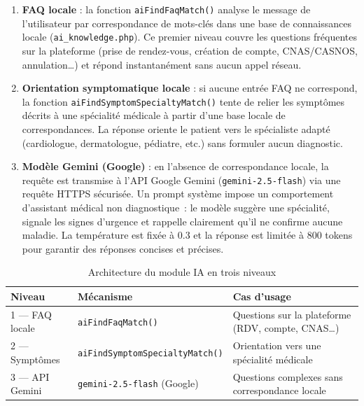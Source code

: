\documentclass[12pt,a4paper]{report}
\begin{document}
\begin{enumerate}
    \item \textbf{FAQ locale} : la fonction \texttt{aiFindFaqMatch()} analyse le message de l'utilisateur par correspondance de mots-cl\'es dans une base de connaissances locale (\texttt{ai\_knowledge.php}). Ce premier niveau couvre les questions fr\'equentes sur la plateforme (prise de rendez-vous, cr\'eation de compte, CNAS/CASNOS, annulation\ldots) et r\'epond instantan\'ement sans aucun appel r\'eseau.

    \item \textbf{Orientation symptomatique locale} : si aucune entr\'ee FAQ ne correspond, la fonction \texttt{aiFindSymptomSpecialtyMatch()} tente de relier les sympt\^omes d\'ecrits \`a une sp\'ecialit\'e m\'edicale \`a partir d'une base locale de correspondances. La r\'eponse oriente le patient vers le sp\'ecialiste adapt\'e (cardiologue, dermatologue, p\'ediatre, etc.) sans formuler aucun diagnostic.

    \item \textbf{Mod\`ele Gemini (Google)} : en l'absence de correspondance locale, la requ\^ete est transmise \`a l'API Google Gemini (\texttt{gemini-2.5-flash}) via une requ\^ete HTTPS s\'ecuris\'ee. Un prompt syst\`eme impose un comportement d'assistant m\'edical non diagnostique~: le mod\`ele sugg\`ere une sp\'ecialit\'e, signale les signes d'urgence et rappelle clairement qu'il ne confirme aucune maladie. La temp\'erature est fix\'ee \`a 0.3 et la r\'eponse est limit\'ee \`a 800 tokens pour garantir des r\'eponses concises et pr\'ecises.
\end{enumerate}

\begin{table}[H]
\centering
\renewcommand{\arraystretch}{1.5}
\caption{Architecture du module IA en trois niveaux}
\begin{tabularx}{\textwidth}{|l|l|X|}
\hline
\textbf{Niveau} & \textbf{M\'ecanisme} & \textbf{Cas d'usage} \\
\hline
1 --- FAQ locale        & \texttt{aiFindFaqMatch()}            & Questions sur la plateforme (RDV, compte, CNAS\ldots) \\
\hline
2 --- Sympt\^omes       & \texttt{aiFindSymptomSpecialtyMatch()} & Orientation vers une sp\'ecialit\'e m\'edicale \\
\hline
3 --- API Gemini        & \texttt{gemini-2.5-flash} (Google)   & Questions complexes sans correspondance locale \\
\hline
\end{tabularx}
\end{table}
\end{document}

